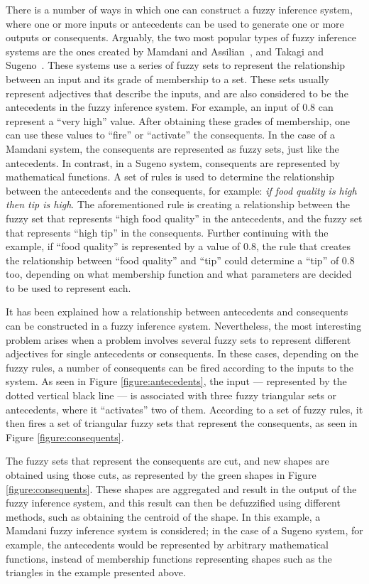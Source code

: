 \documentclass{ieeeaccess}
\begin{document}
There is a number of ways in which one can construct a fuzzy inference system,
where one or more inputs or antecedents can be used to generate one or more
outputs or consequents. Arguably, the two most popular types of fuzzy inference
systems are the ones created by Mamdani and Assilian~\cite{Mamdani1975}, and
Takagi and Sugeno~\cite{Takagi1985}. These systems use a series of fuzzy sets to
represent the relationship between an input and its grade of membership to a
set. These sets usually represent adjectives that describe the inputs, and are
also considered to be the antecedents in the fuzzy inference system. For
example, an input of 0.8 can represent a ``very high'' value. After obtaining
these grades of membership, one can use these values to ``fire'' or ``activate''
the consequents. In the case of a Mamdani system, the consequents are
represented as fuzzy sets, just like the antecedents. In contrast, in a Sugeno
system, consequents are represented by mathematical functions. A set of rules is
used to determine the relationship between the antecedents and the consequents,
for example: \textit{if food quality is high then tip is high}. The
aforementioned rule is creating a relationship between the fuzzy set that
represents ``high food quality'' in the antecedents, and the fuzzy set that
represents ``high tip'' in the consequents. Further continuing with the example,
if ``food quality'' is represented by a value of 0.8, the rule that creates the
relationship between ``food quality'' and ``tip'' could determine a ``tip'' of
0.8 too, depending on what membership function and what parameters are decided
to be used to represent each.

It has been explained how a relationship between antecedents and consequents can
be constructed in a fuzzy inference system. Nevertheless, the most interesting
problem arises when a problem involves several fuzzy sets to represent different
adjectives for single antecedents or consequents. In these cases, depending on
the fuzzy rules, a number of consequents can be fired according to the inputs to
the system. As seen in Figure \ref{figure:antecedents}, the input ---
represented by the dotted vertical black line --- is associated with three fuzzy
triangular sets or antecedents, where it ``activates'' two of them. According to
a set of fuzzy rules, it then fires a set of triangular fuzzy sets that
represent the consequents, as seen in Figure \ref{figure:consequents}.

The fuzzy sets that represent the consequents are cut, and new shapes are
obtained using those cuts, as represented by the green shapes in Figure
\ref{figure:consequents}. These shapes are aggregated and result in the output
of the fuzzy inference system, and this result can then be defuzzified using
different methods, such as obtaining the centroid of the shape. In this example,
a Mamdani fuzzy inference system is considered; in the case of a Sugeno system,
for example, the antecedents would be represented by arbitrary mathematical
functions, instead of membership functions representing shapes such as the
triangles in the example presented above.
\end{document}
